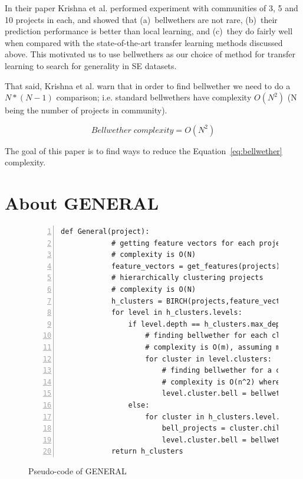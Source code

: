 \documentclass[10pt,journal,compsoc]{IEEEtran}
\begin{document}
In their paper Krishna et al. performed experiment with communities of 3, 5 and 10 projects in each, and showed that (a)~bellwethers are not rare, (b)~their prediction performance is better than local learning, and (c)~they do fairly well when compared with 
the state-of-the-art transfer learning methods discussed above.
This motivated us to use  bellwethers as our choice of method for transfer learning to search for generality in SE datasets. 

That said,  Krishna et al. warn that in order to find bellwether we need to do a $ N*(N-1) $ comparison; i.e. standard bellwethers
have complexity $ O(N^2) $ (N being the number of projects in community). 

\begin{equation}
\label{eq:bellwether}
    \mathit{Bellwether\; complexity } = O(N^2)
\end{equation}

The goal of this paper is to find ways to reduce the Equation~\ref{eq:bellwether} complexity.




 
\section{About GENERAL}
\label{GENERAL}

\begin{figure}[!t]
    \small
     \begin{lstlisting}[mathescape,numbers=left,frame=None]
        def General(project):
            # getting feature vectors for each project
            # complexity is O(N)
            feature_vectors = get_features(projects)
            # hierarchically clustering projects
            # complexity is O(N)
            h_clusters = BIRCH(projects,feature_vectors)
            for level in h_clusters.levels:
                if level.depth == h_clusters.max_depth:
                    # finding bellwether for each cluster at leaf-level
                    # complexity is O(m), assuming m clusters
                    for cluster in level.clusters:
                        # finding bellwether for a cluster
                        # complexity is O(n^2) where n = N/m
                        level.cluster.bell = bellwether(cluster.projects)
                else:
                    for cluster in h_clusters.level.clusters:
                        bell_projects = cluster.child.get_bellwethers()
                        level.cluster.bell = bellwether(bell_projects)
            return h_clusters   

            \end{lstlisting} 
            \vspace{-0.2cm}
            \caption{Pseudo-code of GENERAL}
            \label{fig:Pseudo-code} 
            \vspace{-0.3cm}
\end{figure}
\end{document}
